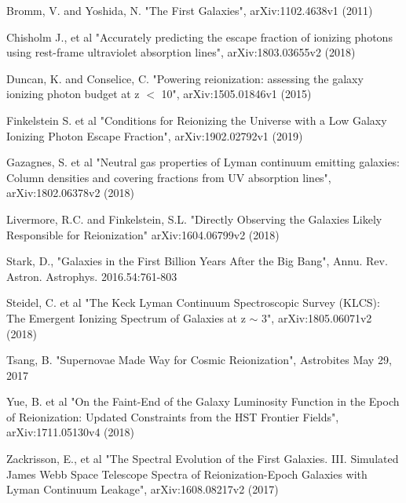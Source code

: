 \documentclass{aastex62}
\begin{document}
\begin{thebibliography}{}
Bromm, V. and Yoshida, N. "The First Galaxies", arXiv:1102.4638v1 (2011)

Chisholm J., et al "Accurately predicting the escape fraction of ionizing photons using rest-frame ultraviolet absorption lines", arXiv:1803.03655v2 (2018)

Duncan, K. and Conselice, C. "Powering reionization: assessing the galaxy ionizing photon budget at z $<$ 10", arXiv:1505.01846v1 (2015)

Finkelstein S. et al "Conditions for Reionizing the Universe with a Low Galaxy Ionizing Photon Escape Fraction", arXiv:1902.02792v1 (2019)

Gazagnes, S. et al "Neutral gas properties of Lyman continuum emitting galaxies: Column densities and covering fractions from UV absorption lines", arXiv:1802.06378v2 (2018)

Livermore, R.C. and Finkelstein, S.L. "Directly Observing the Galaxies Likely Responsible for Reionization" arXiv:1604.06799v2 (2018)

Stark, D., "Galaxies in the First Billion Years After the Big Bang", Annu. Rev. Astron. Astrophys. 2016.54:761-803

Steidel, C. et al "The Keck Lyman Continuum Spectroscopic Survey (KLCS): The Emergent Ionizing Spectrum of Galaxies at z $\sim$ 3", arXiv:1805.06071v2 (2018)

Tsang, B. "Supernovae Made Way for Cosmic Reionization", Astrobites May 29, 2017

Yue, B. et al "On the Faint-End of the Galaxy Luminosity Function in the Epoch of Reionization: Updated Constraints from the HST Frontier Fields", arXiv:1711.05130v4 (2018)

Zackrisson, E., et al "The Spectral Evolution of the First Galaxies. III. Simulated James Webb Space Telescope Spectra of Reionization-Epoch Galaxies with Lyman Continuum Leakage", arXiv:1608.08217v2 (2017)

\end{thebibliography}




\end{document}
